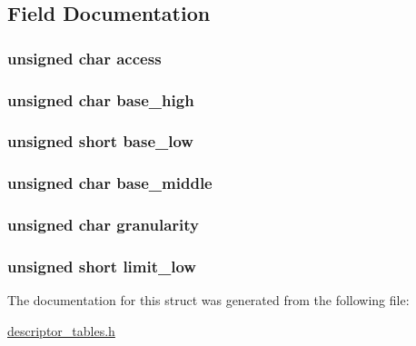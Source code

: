 \subsection{Field Documentation}
\hypertarget{structgdt__entry_a1466f288c685860255d8e68192262c44}{
\subsubsection[{access}]{\setlength{\rightskip}{0pt plus 5cm}unsigned char {\bf access}}}
\label{structgdt__entry_a1466f288c685860255d8e68192262c44}
\hypertarget{structgdt__entry_a2ece4ce625dcee29c9a9e6952055ddd5}{
\subsubsection[{base\_\-high}]{\setlength{\rightskip}{0pt plus 5cm}unsigned char {\bf base\_\-high}}}
\label{structgdt__entry_a2ece4ce625dcee29c9a9e6952055ddd5}
\hypertarget{structgdt__entry_ae4b82d5bd06e0cad3df76bcabedfe194}{
\subsubsection[{base\_\-low}]{\setlength{\rightskip}{0pt plus 5cm}unsigned short {\bf base\_\-low}}}
\label{structgdt__entry_ae4b82d5bd06e0cad3df76bcabedfe194}
\hypertarget{structgdt__entry_a11134ae8e899bd8f22b3d59dd5b86fae}{
\subsubsection[{base\_\-middle}]{\setlength{\rightskip}{0pt plus 5cm}unsigned char {\bf base\_\-middle}}}
\label{structgdt__entry_a11134ae8e899bd8f22b3d59dd5b86fae}
\hypertarget{structgdt__entry_a97775c42d71e8858948fa91b472876fb}{
\subsubsection[{granularity}]{\setlength{\rightskip}{0pt plus 5cm}unsigned char {\bf granularity}}}
\label{structgdt__entry_a97775c42d71e8858948fa91b472876fb}
\hypertarget{structgdt__entry_aacba9616b9bdd5895e8dcf5567e4170c}{
\subsubsection[{limit\_\-low}]{\setlength{\rightskip}{0pt plus 5cm}unsigned short {\bf limit\_\-low}}}
\label{structgdt__entry_aacba9616b9bdd5895e8dcf5567e4170c}


The documentation for this struct was generated from the following file:\begin{DoxyCompactItemize}
\item 
\hyperlink{descriptor__tables_8h}{descriptor\_\-tables.h}\end{DoxyCompactItemize}
